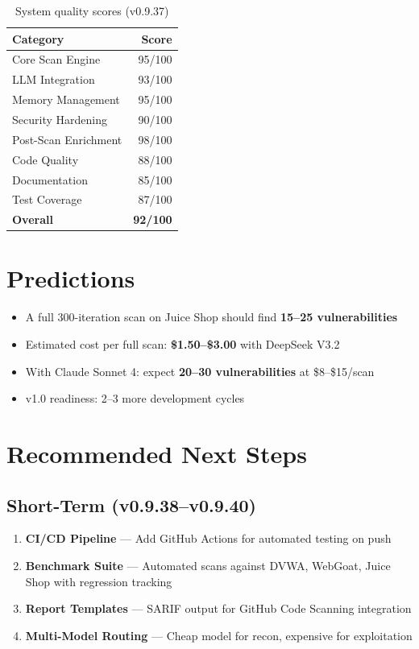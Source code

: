 \documentclass[12pt,a4paper]{report}
\begin{document}
\begin{table}[H]
\centering
\caption{System quality scores (v0.9.37)}
\label{tab:scores}
\begin{tabular}{lr}
\toprule
\textbf{Category} & \textbf{Score} \\
\midrule
Core Scan Engine        & 95/100 \\
LLM Integration         & 93/100 \\
Memory Management       & 95/100 \\
Security Hardening      & 90/100 \\
Post-Scan Enrichment    & 98/100 \\
Code Quality            & 88/100 \\
Documentation           & 85/100 \\
Test Coverage           & 87/100 \\
\midrule
\textbf{Overall}        & \textbf{92/100} \\
\bottomrule
\end{tabular}
\end{table}

\section{Predictions}
\begin{itemize}[noitemsep]
  \item A full 300-iteration scan on Juice Shop should find \textbf{15--25 vulnerabilities}
  \item Estimated cost per full scan: \textbf{\$1.50--\$3.00} with DeepSeek V3.2
  \item With Claude Sonnet 4: expect \textbf{20--30 vulnerabilities} at \$8--\$15/scan
  \item v1.0 readiness: 2--3 more development cycles
\end{itemize}

\section{Recommended Next Steps}

\subsection{Short-Term (v0.9.38--v0.9.40)}
\begin{enumerate}[noitemsep]
  \item \textbf{CI/CD Pipeline} --- Add GitHub Actions for automated testing on push
  \item \textbf{Benchmark Suite} --- Automated scans against DVWA, WebGoat, Juice Shop with regression tracking
  \item \textbf{Report Templates} --- SARIF output for GitHub Code Scanning integration
  \item \textbf{Multi-Model Routing} --- Cheap model for recon, expensive for exploitation
\end{enumerate}
\end{document}
